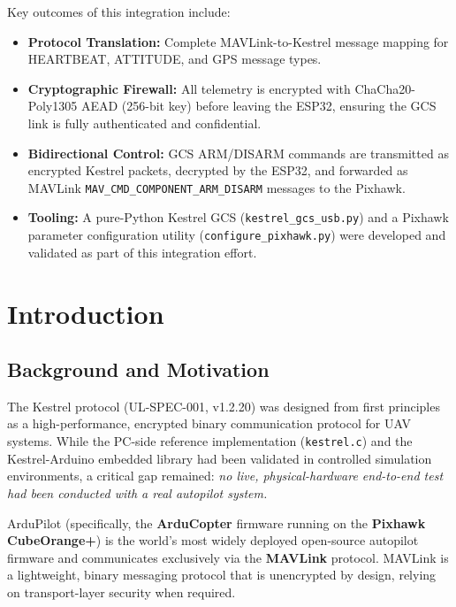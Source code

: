 \documentclass[11pt,a4paper]{article}
\begin{document}
\vspace{0.5cm}

Key outcomes of this integration include:
\begin{itemize}[noitemsep]
    \item \textbf{Protocol Translation:} Complete MAVLink-to-Kestrel message
          mapping for HEARTBEAT, ATTITUDE, and GPS message types.
    \item \textbf{Cryptographic Firewall:} All telemetry is encrypted with
          ChaCha20-Poly1305 AEAD (256-bit key) before leaving the ESP32,
          ensuring the GCS link is fully authenticated and confidential.
    \item \textbf{Bidirectional Control:} GCS ARM/DISARM commands are
          transmitted as encrypted Kestrel packets, decrypted by the ESP32,
          and forwarded as MAVLink \texttt{MAV\_CMD\_COMPONENT\_ARM\_DISARM}
          messages to the Pixhawk.
    \item \textbf{Tooling:} A pure-Python Kestrel GCS
          (\texttt{kestrel\_gcs\_usb.py}) and a Pixhawk parameter configuration
          utility (\texttt{configure\_pixhawk.py}) were developed and validated
          as part of this integration effort.
\end{itemize}

\newpage

\section{Introduction}

\subsection{Background and Motivation}

The Kestrel protocol (UL-SPEC-001, v1.2.20) was designed from first principles
as a high-performance, encrypted binary communication protocol for UAV systems.
While the PC-side reference implementation (\texttt{kestrel.c}) and the
Kestrel-Arduino embedded library had been validated in controlled simulation
environments, a critical gap remained: \emph{no live, physical-hardware
end-to-end test had been conducted with a real autopilot system.}

ArduPilot (specifically, the \textbf{ArduCopter} firmware running on the
\textbf{Pixhawk CubeOrange+}) is the world's most widely deployed open-source
autopilot firmware and communicates exclusively via the \textbf{MAVLink} protocol.
MAVLink is a lightweight, binary messaging protocol that is unencrypted by design,
relying on transport-layer security when required.
\end{document}
